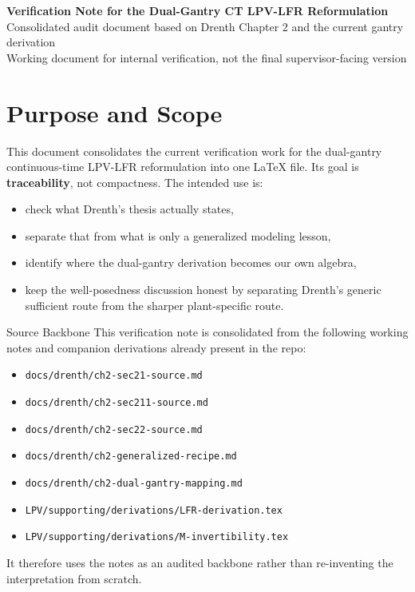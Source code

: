 ﻿\documentclass[11pt]{article}
\begin{document}
\begin{center}
    {\LARGE\bfseries Verification Note for the Dual-Gantry CT LPV-LFR Reformulation}\\[0.5em]
    {\large Consolidated audit document based on Drenth Chapter 2 and the current gantry derivation}\\[0.3em]
    {\normalsize Working document for internal verification, not the final supervisor-facing version}
\end{center}

\vspace{0.7em}

\section{Purpose and Scope}

This document consolidates the current verification work for the dual-gantry
continuous-time LPV-LFR reformulation into one \LaTeX{} file. Its goal is
\textbf{traceability}, not compactness. The intended use is:

\begin{itemize}[leftmargin=1.2em]
    \item check what Drenth's thesis actually states,
    \item separate that from what is only a generalized modeling lesson,
    \item identify where the dual-gantry derivation becomes our own algebra,
    \item keep the well-posedness discussion honest by separating Drenth's
    generic sufficient route from the sharper plant-specific route.
\end{itemize}

\begin{notebox}{Source Backbone}
This verification note is consolidated from the following working notes and
companion derivations already present in the repo:
\begin{itemize}[leftmargin=1.2em]
    \item \texttt{docs/drenth/ch2-sec21-source.md}
    \item \texttt{docs/drenth/ch2-sec211-source.md}
    \item \texttt{docs/drenth/ch2-sec22-source.md}
    \item \texttt{docs/drenth/ch2-generalized-recipe.md}
    \item \texttt{docs/drenth/ch2-dual-gantry-mapping.md}
    \item \texttt{LPV/supporting/derivations/LFR-derivation.tex}
    \item \texttt{LPV/supporting/derivations/M-invertibility.tex}
\end{itemize}
It therefore uses the notes as an audited backbone rather than re-inventing the
interpretation from scratch.
\end{notebox}
\end{document}
